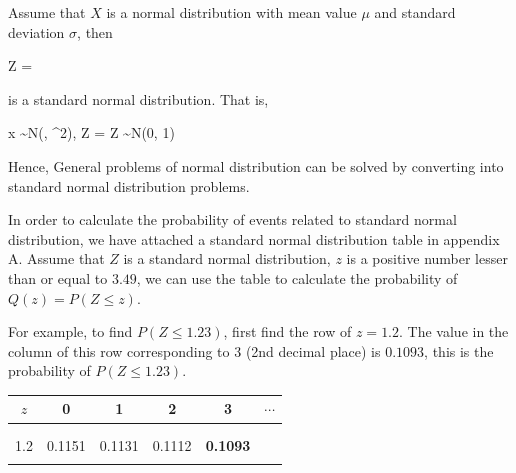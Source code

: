 \documentclass{report}
\begin{document}
\begin{multicols}{2}
\begin{center}
  \end{center}

  Assume that $X$ is a normal distribution with mean value $\mu$ and standard
  deviation $\sigma$, then
  \begin{cequation}
    Z = 
  \end{cequation}
  is a standard normal distribution. That is,
  \begin{cequation}
     x \sim N(\mu, \sigma^2),  Z = \text{, } Z \sim N(0, 1)
  \end{cequation}

  Hence, General problems of normal distribution can be solved by converting into
  standard normal distribution problems.

  In order to calculate the probability of events related to standard normal
  distribution, we have attached a standard normal distribution table in appendix
  A. Assume that $Z$ is a standard normal distribution, $z$ is a positive number
  lesser than or equal to $3.49$, we can use the table to calculate the
  probability of $Q(z) = P(Z \leq z)$.

  For example, to find $P(Z \leq 1.23)$, first find the row of $z = 1.2$. The
  value in the column of this row corresponding to 3 (2nd decimal place) is
  $0.1093$, this is the probability of $P(Z \leq 1.23)$.
  \begin{center}
    \begin{tabular}{|c|c|c|c|c|c|}
      \hline
      $z$ & 0      & 1                     & 2      & 3               & $\cdots$ \\
      \hline
          &        & \multicolumn{3}{c|}{} &                                     \\
          &        & \multicolumn{3}{c|}{} &                                     \\
      \hline
      1.2 & 0.1151 & 0.1131                & 0.1112 & \textbf{0.1093} &          \\
      \hline
          &        & \multicolumn{3}{c|}{} &                                     \\
      \hline
    \end{tabular}
  \end{center}


\end{multicols}
\end{document}
